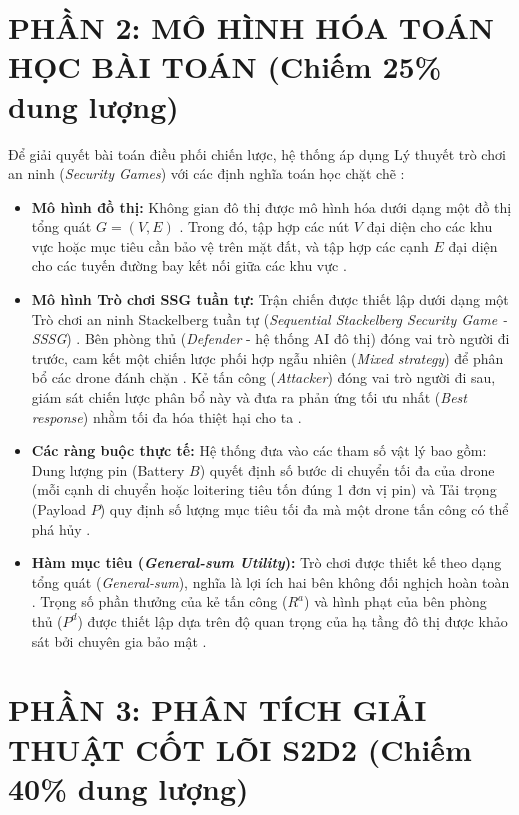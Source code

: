 \documentclass[11pt,a4paper]{article}
\begin{document}
\section{PHẦN 2: MÔ HÌNH HÓA TOÁN HỌC BÀI TOÁN (Chiếm 25\% dung lượng)}

Để giải quyết bài toán điều phối chiến lược, hệ thống áp dụng Lý thuyết trò chơi an ninh (\textit{Security Games}) với các định nghĩa toán học chặt chẽ \cite{mutzari2025defending}:
\begin{itemize}
    \item \textbf{Mô hình đồ thị:} Không gian đô thị được mô hình hóa dưới dạng một đồ thị tổng quát $G=(V,E)$ \cite{mutzari2025defending}. Trong đó, tập hợp các nút $V$ đại diện cho các khu vực hoặc mục tiêu cần bảo vệ trên mặt đất, và tập hợp các cạnh $E$ đại diện cho các tuyến đường bay kết nối giữa các khu vực \cite{mutzari2025defending}.
    \item \textbf{Mô hình Trò chơi SSG tuần tự:} Trận chiến được thiết lập dưới dạng một Trò chơi an ninh Stackelberg tuần tự (\textit{Sequential Stackelberg Security Game - SSSG}) \cite{mutzari2025defending}. Bên phòng thủ (\textit{Defender} - hệ thống AI đô thị) đóng vai trò người đi trước, cam kết một chiến lược phối hợp ngẫu nhiên (\textit{Mixed strategy}) để phân bổ các drone đánh chặn \cite{mutzari2025defending}. Kẻ tấn công (\textit{Attacker}) đóng vai trò người đi sau, giám sát chiến lược phân bổ này và đưa ra phản ứng tối ưu nhất (\textit{Best response}) nhằm tối đa hóa thiệt hại cho ta \cite{mutzari2025defending}.
    \item \textbf{Các ràng buộc thực tế:} Hệ thống đưa vào các tham số vật lý bao gồm: Dung lượng pin (Battery $B$) quyết định số bước di chuyển tối đa của drone (mỗi cạnh di chuyển hoặc loitering tiêu tốn đúng 1 đơn vị pin) và Tải trọng (Payload $P$) quy định số lượng mục tiêu tối đa mà một drone tấn công có thể phá hủy \cite{mutzari2025defending}.
    \item \textbf{Hàm mục tiêu (\textit{General-sum Utility}):} Trò chơi được thiết kế theo dạng tổng quát (\textit{General-sum}), nghĩa là lợi ích hai bên không đối nghịch hoàn toàn \cite{mutzari2025defending}. Trọng số phần thưởng của kẻ tấn công ($R^a$) và hình phạt của bên phòng thủ ($P^d$) được thiết lập dựa trên độ quan trọng của hạ tầng đô thị được khảo sát bởi chuyên gia bảo mật \cite{mutzari2025defending}.
\end{itemize}

\section{PHẦN 3: PHÂN TÍCH GIẢI THUẬT CỐT LÕI S2D2 (Chiếm 40\% dung lượng)}
\end{document}
